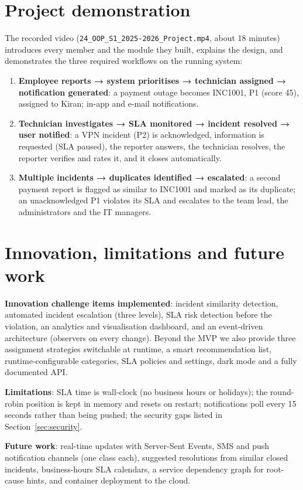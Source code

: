 \documentclass[11pt,a4paper]{article}
\begin{document}
\section{Project demonstration}
The recorded video (\texttt{24\_OOP\_S1\_2025-2026\_Project.mp4}, about 18 minutes) introduces every member and the module they built, explains the design, and demonstrates the three required workflows on the running system:
\begin{enumerate}
\item \textbf{Employee reports → system prioritises → technician assigned → notification generated}: a payment outage becomes INC1001, P1 (score 45), assigned to Kiran; in-app and e-mail notifications.
\item \textbf{Technician investigates → SLA monitored → incident resolved → user notified}: a VPN incident (P2) is acknowledged, information is requested (SLA paused), the reporter answers, the technician resolves, the reporter verifies and rates it, and it closes automatically.
\item \textbf{Multiple incidents → duplicates identified → escalated}: a second payment report is flagged as similar to INC1001 and marked as its duplicate; an unacknowledged P1 violates its SLA and escalates to the team lead, the administrators and the IT managers.
\end{enumerate}
\section{Innovation, limitations and future work}
\textbf{Innovation challenge items implemented}: incident similarity detection, automated incident escalation (three levels), SLA risk detection before the violation, an analytics and visualisation dashboard, and an event-driven architecture (observers on every change). Beyond the MVP we also provide three assignment strategies switchable at runtime, a smart recommendation list, runtime-configurable categories, SLA policies and settings, dark mode and a fully documented API.

\textbf{Limitations}: SLA time is wall-clock (no business hours or holidays); the round-robin position is kept in memory and resets on restart; notifications poll every 15 seconds rather than being pushed; the security gaps listed in Section~\ref{sec:security}.

\textbf{Future work}: real-time updates with Server-Sent Events, SMS and push notification channels (one class each), suggested resolutions from similar closed incidents, business-hours SLA calendars, a service dependency graph for root-cause hints, and container deployment to the cloud.
\end{document}
